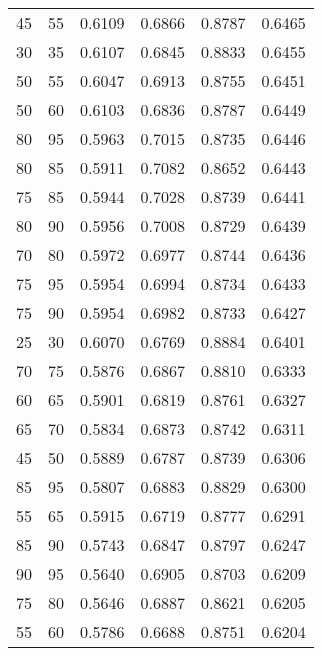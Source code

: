 \begin{center}
\begin{longtable}{|l|l|l|l|l|l|}
45                & 55                & 0.6109    & 0.6866 & 0.8787      & 0.6465    \\
30                & 35                & 0.6107    & 0.6845 & 0.8833      & 0.6455    \\
50                & 55                & 0.6047    & 0.6913 & 0.8755      & 0.6451    \\
50                & 60                & 0.6103    & 0.6836 & 0.8787      & 0.6449    \\
80                & 95                & 0.5963    & 0.7015 & 0.8735      & 0.6446    \\
80                & 85                & 0.5911    & 0.7082 & 0.8652      & 0.6443    \\
75                & 85                & 0.5944    & 0.7028 & 0.8739      & 0.6441    \\
80                & 90                & 0.5956    & 0.7008 & 0.8729      & 0.6439    \\
70                & 80                & 0.5972    & 0.6977 & 0.8744      & 0.6436    \\
75                & 95                & 0.5954    & 0.6994 & 0.8734      & 0.6433    \\
75                & 90                & 0.5954    & 0.6982 & 0.8733      & 0.6427    \\
25                & 30                & 0.6070    & 0.6769 & 0.8884      & 0.6401    \\
70                & 75                & 0.5876    & 0.6867 & 0.8810      & 0.6333    \\
60                & 65                & 0.5901    & 0.6819 & 0.8761      & 0.6327    \\
65                & 70                & 0.5834    & 0.6873 & 0.8742      & 0.6311    \\
45                & 50                & 0.5889    & 0.6787 & 0.8739      & 0.6306    \\
85                & 95                & 0.5807    & 0.6883 & 0.8829      & 0.6300    \\
55                & 65                & 0.5915    & 0.6719 & 0.8777      & 0.6291    \\
85                & 90                & 0.5743    & 0.6847 & 0.8797      & 0.6247    \\
90                & 95                & 0.5640    & 0.6905 & 0.8703      & 0.6209    \\
75                & 80                & 0.5646    & 0.6887 & 0.8621      & 0.6205    \\
55                & 60                & 0.5786    & 0.6688 & 0.8751      & 0.6204
\end{longtable}

\end{center}

